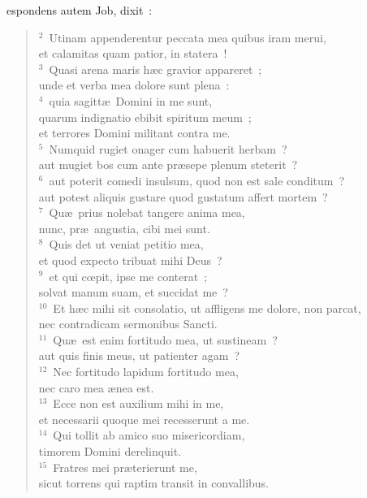 \bchapter
{}espondens autem Job, dixit~:
\begin{flushleft}\begin{verse}\vspace{6pt}${}^{2}$~Utinam appenderentur peccata mea quibus iram merui,\\ et calamitas quam patior, in statera~!\\
${}^{3}$~Quasi arena maris h\ae c gravior appareret~;\\ unde et verba mea dolore sunt plena~:\\
${}^{4}$~quia sagitt\ae\ Domini in me sunt,\\ quarum indignatio ebibit spiritum meum~;\\ et terrores Domini militant contra me.\\
${}^{5}$~Numquid rugiet onager cum habuerit herbam~?\\ aut mugiet bos cum ante pr\ae sepe plenum steterit~?\\
${}^{6}$~aut poterit comedi insulsum, quod non est sale conditum~?\\ aut potest aliquis gustare quod gustatum affert mortem~?\\
${}^{7}$~Qu\ae\ prius nolebat tangere anima mea,\\ nunc, pr\ae\ angustia, cibi mei sunt.\\
${}^{8}$~Quis det ut veniat petitio mea,\\ et quod expecto tribuat mihi Deus~?\\
${}^{9}$~et qui cœpit, ipse me conterat~;\\ solvat manum suam, et succidat me~?\\
${}^{10}$~Et h\ae c mihi sit consolatio, ut affligens me dolore, non parcat,\\ nec contradicam sermonibus Sancti.\\
${}^{11}$~Qu\ae\ est enim fortitudo mea, ut sustineam~?\\ aut quis finis meus, ut patienter agam~?\\
${}^{12}$~Nec fortitudo lapidum fortitudo mea,\\ nec caro mea \ae nea est.\\
${}^{13}$~Ecce non est auxilium mihi in me,\\ et necessarii quoque mei recesserunt a me.\\
${}^{14}$~Qui tollit ab amico suo misericordiam,\\ timorem Domini derelinquit.\\
${}^{15}$~Fratres mei pr\ae terierunt me,\\ sicut torrens qui raptim transit in convallibus.\\

\end{verse}
\end{flushleft}
